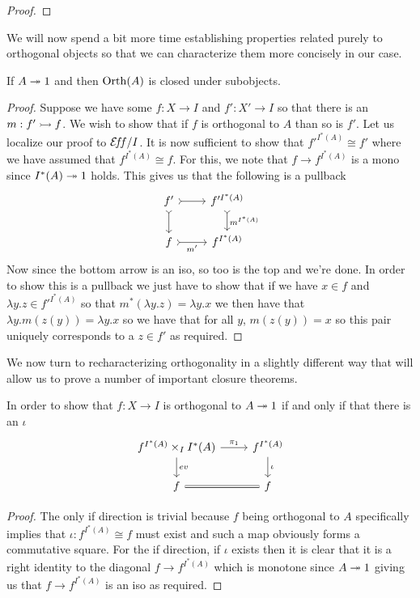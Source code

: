 \begin{proof}
\end{proof}
We will now spend a bit more time establishing properties related
purely to orthogonal objects so that we can characterize them more
concisely in our case.
\begin{lem}\label{lem:orth:orthsubobjects}
  If $A \twoheadrightarrow 1$ and then $\operatorname{Orth}(A)$ is closed under subobjects.
\end{lem}
\begin{proof}
  Suppose we have some $f : X \to I$ and $f' : X' \to I$ so that there
  is an $m : f' \rightarrowtail f$. We wish to show that if $f$ is orthogonal to
  $A$ than so is $f'$. Let us localize our proof to $\mathcal{E}\!f\!f/I$. It is
  now sufficient to show that $f'^{I^*(A)} \cong f'$ where we have
  assumed that $f^{I^*(A)} \cong f$. For this, we note that
  $f \to f^{I^*(A)}$ is a mono since $I^*(A) \twoheadrightarrow 1$ holds. This gives
  us that the following is a pullback
  \[
    \begin{tikzcd}
      f' \ar[d, rightarrowtail] \ar[r, rightarrowtail] & {f'^{I^*(A)}} \ar[d, rightarrowtail, "m^{I^*(A)}"]\\
      f \ar[r, rightarrowtail, swap, "m'"] & {f^{I^*(A)}}
    \end{tikzcd}
  \]
  Now since the bottom arrow is an iso, so too is the top and we're
  done. In order to show this is a pullback we just have to show that
  if we have $x \in f$ and $\lambda y. z \in f'^{I^*(A)}$ so that
  $m^*(\lambda y. z) = \lambda y. x$ we then have that
  $\lambda y. m(z(y)) = \lambda y. x$ so we have that for all $y$,
  $m(z(y)) = x$ so this pair uniquely corresponds to a $z \in f'$ as
  required.
\end{proof}
We now turn to recharacterizing orthogonality in a slightly different
way that will allow us to prove a number of important closure
theorems.
\begin{lem}\label{lem:orth:orthpushout}
  In order to show that $f : X \to I$ is orthogonal to $A \twoheadrightarrow 1$ if
  and only if that there is an $\iota$
  \[
    \begin{tikzcd}
      f^{I^*(A)} \times_I I^*(A) \ar[r, "\pi_1"] \ar[d, "ev"] & f^{I^*(A)} \ar[d, "\iota"]\\
      f \ar[r, equals] & f
    \end{tikzcd}
  \]
\end{lem}
\begin{proof}
  The only if direction is trivial because $f$ being orthogonal to $A$
  specifically implies that $\iota : f^{I^*(A)} \cong f$ must exist
  and such a map obviously forms a commutative square. For the if
  direction, if $\iota$ exists then it is clear that it is a right
  identity to the diagonal $f \to f^{I^*(A)}$ which is monotone since
  $A \twoheadrightarrow 1$ giving us that $f \to f^{I^*(A)}$ is an iso as required.
\end{proof}
